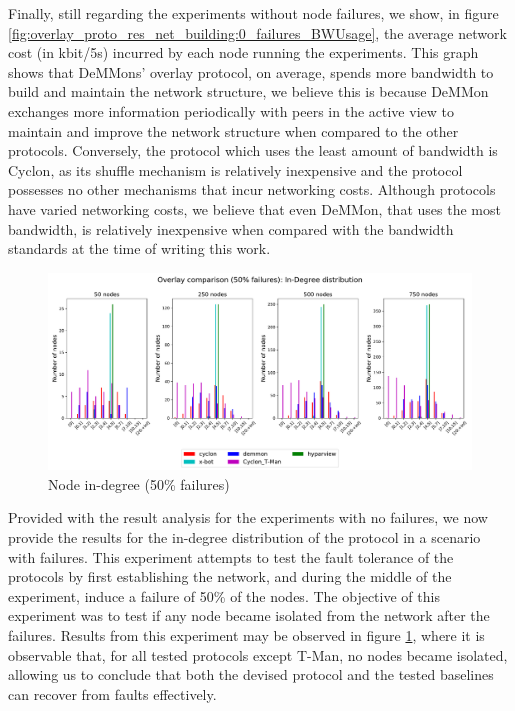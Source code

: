 Finally, still regarding the experiments without node failures, we show, in figure \ref{fig:overlay_proto_res_net_building:0_failures_BWUsage}, the average network cost (in kbit/5s) incurred by each node running the experiments. This graph shows that DeMMons' overlay protocol, on average, spends more bandwidth to build and maintain the network structure, we believe this is because DeMMon exchanges more information periodically with peers in the active view to maintain and improve the network structure when compared to the other protocols. Conversely, the protocol which uses the least amount of bandwidth is Cyclon, as its shuffle mechanism is relatively inexpensive and the protocol possesses no other mechanisms that incur networking costs. Although protocols have varied networking costs, we believe that even DeMMon, that uses the most bandwidth, is relatively inexpensive when compared with the bandwidth standards at the time of writing this work.

\begin{figure}
    \centering
    \includegraphics[width=\linewidth]{Chapters/evaluation/figures/membership/membership_inDegree_50_failures.pdf}
    \caption{Node in-degree (50\% failures)}
    \label{fig:overlay_proto_res_net_building:50_failures_inDegree}
\end{figure}

Provided with the result analysis for the experiments with no failures, we now provide the results for the in-degree distribution of the protocol in a scenario with failures. This experiment attempts to test the fault tolerance of the protocols by first establishing the network, and during the middle of the experiment, induce a failure of 50\% of the nodes. The objective of this experiment was to test if any node became isolated from the network after the failures. Results from this experiment may be observed in figure \ref{fig:overlay_proto_res_net_building:50_failures_inDegree}, where it is observable that, for all tested protocols except T-Man, no nodes became isolated, allowing us to conclude that both the devised protocol and the tested baselines can recover from faults effectively.

